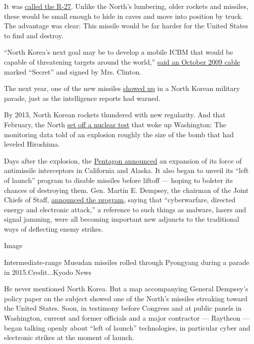 It was \href{http://www.navweaps.com/Weapons/WMRUS_R-27.php}{called the
R-27}. Unlike the North's lumbering, older rockets and missiles, these
would be small enough to hide in caves and move into position by truck.
The advantage was clear: This missile would be far harder for the United
States to find and destroy.

``North Korea's next goal may be to develop a mobile ICBM that would be
capable of threatening targets around the world,''
\href{https://wikileaks.org/plusd/cables/08STATE105029_a.html}{said an
October 2009 cable} marked ``Secret'' and signed by Mrs. Clinton.

The next year, one of the new missiles
\href{https://en.wikipedia.org/wiki/Hwasong-10}{showed up} in a North
Korean military parade, just as the intelligence reports had warned.

By 2013, North Korean rockets thundered with new regularity. And that
February, the North
\href{http://www.nytimes.com/2013/02/12/world/asia/north-korea-nuclear-test.html?ref=global-home}{set
off a nuclear test} that woke up Washington: The monitoring data told of
an explosion roughly the size of the bomb that had leveled Hiroshima.

Days after the explosion, the
\href{http://archive.defense.gov/Speeches/Speech.aspx?SpeechID=1759}{Pentagon
announced} an expansion of its force of antimissile interceptors in
California and Alaska. It also began to unveil its ``left of launch''
program to disable missiles before liftoff --- hoping to bolster its
chances of destroying them. Gen. Martin E. Dempsey, the chairman of the
Joint Chiefs of Staff,
\href{http://www.jcs.mil/Portals/36/Documents/Publications/JointIAMDVision2020.pdf}{announced
the program}, saying that ``cyberwarfare, directed energy and electronic
attack,'' a reference to such things as malware, lasers and signal
jamming, were all becoming important new adjuncts to the traditional
ways of deflecting enemy strikes.

Image

Intermediate-range Musudan missiles rolled through Pyongyang during a
parade in 2015.Credit...Kyodo News

He never mentioned North Korea. But a map accompanying General Dempsey's
policy paper on the subject showed one of the North's missiles streaking
toward the United States. Soon, in testimony before Congress and at
public panels in Washington, current and former officials and a major
contractor --- Raytheon --- began talking openly about ``left of
launch'' technologies, in particular cyber and electronic strikes at the
moment of launch.

